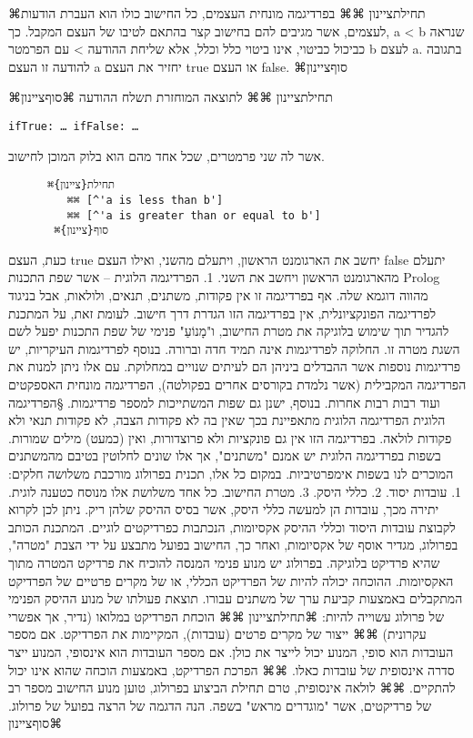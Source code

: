           ⌘תחילת{ציינון}
     ⌘⌘  בפרדיגמה מונחית העצמים, כל החישוב כולו הוא העברת הודעות לעצמים, אשר
      מגיבים להם בחישוב קצר בהתאם לטיבו של העצם המקבל. כך, a < b שנראה
      כביכול כביטוי, אינו ביטוי כלל וכלל, אלא שליחת ההודעה > עם הפרמטר b
      לעצם a. בתגובה להודעה זו העצם a יחזיר את העצם true או העצם false.
  ⌘סוף{ציינון}

    ⌘תחילת{ציינון}
      ⌘⌘ לתוצאה המוחזרת תשלח ההודעה
    ⌘סוף{ציינון}

\begin{verbatim}
ifTrue: … ifFalse: …
\end{verbatim}

      אשר לה שני פרמטרים, שכל אחד מהם הוא בלוק המוכן לחישוב.
\begin{verbatim}
      ⌘תחילת{ציינון}
         ⌘⌘ [^'a is less than b']
         ⌘⌘ [^'a is greater than or equal to b']
       ⌘סוף{ציינון}
\end{verbatim}
      כעת, העצם true יחשב את הארגומנט הראשון, ויתעלם מהשני, ואילו העצם false יתעלם מהארגומנט הראשון ויחשב את השני.
      1. הפרדיגמה הלוגית – אשר שפת התכנות Prolog מהווה דוגמא שלה. אף בפרדיגמה זו אין פקודות, משתנים, תנאים, ולולאות, אבל בניגוד לפרדיגמה הפונקציונלית, אין בפרדיגמה הזו הגדרת דרך חישוב. לעומת זאת, על המתכנת להגדיר תוך שימוש בלוגיקה את מטרת החישוב, ו"מָנוֹעַ" פנימי של שפת התכנות יפעל לשם השגת מטרה זו.
      החלוקה לפרדיגמות אינה תמיד חדה וברורה. בנוסף לפרדיגמות העיקריות, יש פרדיגמות נוספות אשר ההבדלים ביניהן הם לעיתים שנויים במחלוקת. עם אלו ניתן למנות את הפרדיגמה המקבילית (אשר נלמדת בקורסים אחרים בפקולטה), הפרדיגמה מונחית האספקטים ועוד רבות רבות אחרות. בנוסף, ישנן גם שפות המשתייכות למספר פרדיגמות.
      §הפרדיגמה הלוגית
      הפרדיגמה הלוגית מתאפיינת בכך שאין בה לא פקודות הצבה, לא פקודות תנאי ולא פקודות לולאה. בפרדיגמה הזו אין גם פונקציות ולא פרוצדורות, ואין (כמעט) מילים שמורות. בשפות בפרדיגמה הלוגית יש אמנם "משתנים", אך אלו שונים לחלוטין בטיבם מהמשתנים המוכרים לנו בשפות אימפרטיביות.
      במקום כל אלו, תכנית בפרולוג מורכבת משלושה חלקים:
      1. עובדות יסוד.
      2. כללי היסק.
      3. מטרת החישוב.
      כל אחד משלושת אלו מנוסח כטענה לוגית. יתירה מכך, עובדות הן למעשה כללי היסק, אשר בסיס ההיסק שלהן ריק. ניתן לכן לקרוא לקבוצת עובדות היסוד וכללי ההיסק אקסיומות, הנכתבות כפרדיקטים לוגיים. המתכנת הכותב בפרולוג, מגדיר אוסף של אקסיומות, ואחר כך, החישוב בפועל מתבצע על ידי הצבת "מטרה", שהיא פרדיקט בלוגיקה.
      בפרולוג יש מנוע פנימי המנסה להוכיח את פרדיקט המטרה מתוך האקסיומות. ההוכחה יכולה להיות של הפרדיקט הכללי, או של מקרים פרטיים של הפרדיקט המתקבלים באמצעות קביעת ערך של משתנים עבורו.
      תוצאת פעולתו של מנוע ההיסק הפנימי של פרולוג עשוייה להיות:
      ⌘תחילת{ציינון}
      ⌘⌘ הוכחת הפרדיקט במלואו (נדיר, אך אפשרי עקרונית)
      ⌘⌘ ייצור של מקרים פרטים (עובדות), המקיימות את הפרדיקט. אם מספר העובדות הוא סופי, המנוע יכול לייצר את כולן. אם מספר העובדות הוא אינסופי, המנוע ייצר סדרה אינסופית של עובדות כאלו.
      ⌘⌘ הפרכת הפרדיקט, באמצעות הוכחה שהוא אינו יכול להתקיים.
      ⌘⌘ לולאה אינסופית,
      טרם תחילת הביצוע בפרולוג, טוען מנוע החישוב מספר רב של פרדיקטים, אשר "מוגדרים מראש" בשפה.
      הנה הדגמה של הרצה בפועל של פרולוג.
  ⌘סוף{ציינון}

